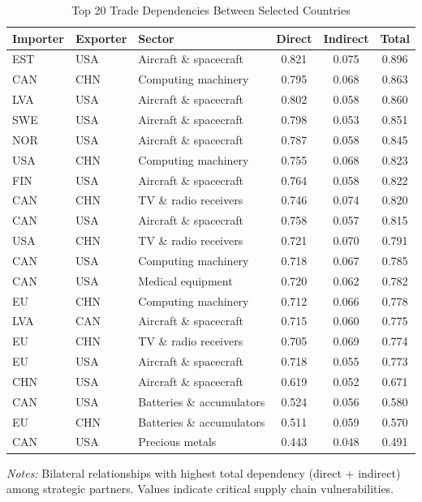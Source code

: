 \documentclass[final,1p,times,authoryear]{elsarticle}
\begin{document}
\begin{table}[!t]
\centering
\caption{Top 20 Trade Dependencies Between Selected Countries}
\label{tab:critical_dependencies}
\scriptsize
\renewcommand{\arraystretch}{1.0}
\begin{tabular}{@{}p{1.8cm}p{1.8cm}p{3.2cm}ccc@{}}
\toprule
\textbf{Importer} & \textbf{Exporter} & \textbf{Sector} & \textbf{Direct} & \textbf{Indirect} & \textbf{Total} \\
\midrule
EST & USA & Aircraft \& spacecraft & 0.821 & 0.075 & 0.896 \\
CAN & CHN & Computing machinery & 0.795 & 0.068 & 0.863 \\
LVA & USA & Aircraft \& spacecraft & 0.802 & 0.058 & 0.860 \\
SWE & USA & Aircraft \& spacecraft & 0.798 & 0.053 & 0.851 \\
NOR & USA & Aircraft \& spacecraft & 0.787 & 0.058 & 0.845 \\
USA & CHN & Computing machinery & 0.755 & 0.068 & 0.823 \\
FIN & USA & Aircraft \& spacecraft & 0.764 & 0.058 & 0.822 \\
CAN & CHN & TV \& radio receivers & 0.746 & 0.074 & 0.820 \\
CAN & USA & Aircraft \& spacecraft & 0.758 & 0.057 & 0.815 \\
USA & CHN & TV \& radio receivers & 0.721 & 0.070 & 0.791 \\
CAN & USA & Computing machinery & 0.718 & 0.067 & 0.785 \\
CAN & USA & Medical equipment & 0.720 & 0.062 & 0.782 \\
EU & CHN & Computing machinery & 0.712 & 0.066 & 0.778 \\
LVA & CAN & Aircraft \& spacecraft & 0.715 & 0.060 & 0.775 \\
EU & CHN & TV \& radio receivers & 0.705 & 0.069 & 0.774 \\
EU & USA & Aircraft \& spacecraft & 0.718 & 0.055 & 0.773 \\
CHN & USA & Aircraft \& spacecraft & 0.619 & 0.052 & 0.671 \\
CAN & USA & Batteries \& accumulators & 0.524 & 0.056 & 0.580 \\
EU & CHN & Batteries \& accumulators & 0.511 & 0.059 & 0.570 \\
CAN & USA & Precious metals & 0.443 & 0.048 & 0.491 \\
\bottomrule
\end{tabular}
\begin{tablenotes}
\scriptsize
\item \textit{Notes:} Bilateral relationships with highest total dependency (direct + indirect) among strategic partners. Values indicate critical supply chain vulnerabilities.
\end{tablenotes}
\end{table}
\end{document}
